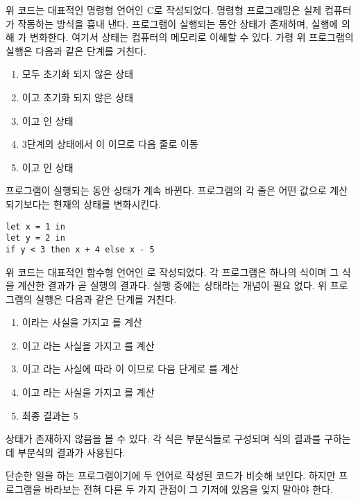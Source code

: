 위 코드는 대표적인 명령형 언어인 C로 작성되었다. 명령형 프로그래밍은 실제
컴퓨터가 작동하는 방식을 흉내 낸다. 프로그램이 실행되는 동안 상태가 존재하며,
실행에 의해 가 변화한다. 여기서 상태는 컴퓨터의 메모리로 이해할 수
있다. 가령 위 프로그램의 실행은 다음과 같은 단계를 거친다.

\begin{enumerate}
\item {}  모두 초기화 되지 않은 상태
\item {} 이고  초기화 되지 않은 상태
\item {} 이고  인 상태
\item 3단계의 상태에서 이 이므로 다음 줄로 이동
\item {} 이고  인 상태
\end{enumerate}

프로그램이 실행되는 동안 상태가 계속 바뀐다. 프로그램의 각 줄은 어떤 값으로
계산되기보다는 현재의 상태를 변화시킨다.

\begin{verbatim}
let x = 1 in
let y = 2 in
if y < 3 then x + 4 else x - 5
\end{verbatim}

위 코드는 대표적인 함수형 언어인 로 작성되었다. 각 프로그램은
하나의 식이며 그 식을 계산한 결과가 곧 실행의 결과다. 실행 중에는 상태라는
개념이 필요 없다. 위 프로그램의 실행은 다음과 같은 단계를 거친다.

\begin{enumerate}
\item {} 이라는 사실을 가지고 를 계산
\item {} 이고  라는 사실을 가지고 를 계산
\item {} 이고  라는 사실에 따라 이
  이므로 다음 단계로 를 계산
\item {} 이고  라는 사실을 가지고 를 계산
\item 최종 결과는 5
\end{enumerate}

상태가 존재하지 않음을 볼 수 있다. 각 식은 부분식들로 구성되며 식의 결과를
구하는 데 부분식의 결과가 사용된다.

단순한 일을 하는 프로그램이기에 두 언어로 작성된 코드가 비슷해 보인다. 하지만
프로그램을 바라보는 전혀 다른 두 가지 관점이 그 기저에 있음을 잊지 말아야 한다.


